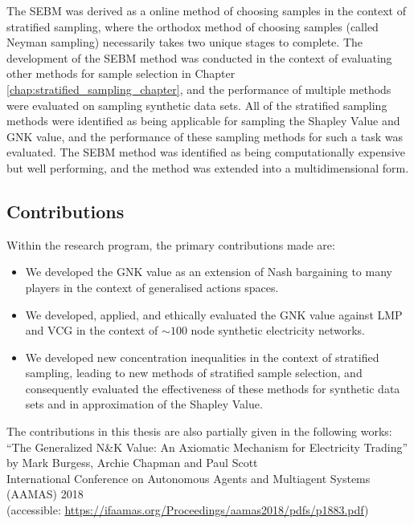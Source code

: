 The SEBM was derived as a online method of choosing samples in the context of stratified sampling, where the orthodox method of choosing samples (called Neyman sampling) necessarily takes two unique stages to complete.
The development of the SEBM method was conducted in the context of evaluating other methods for sample selection in Chapter \ref{chap:stratified_sampling_chapter}, and the performance of multiple methods were evaluated on sampling synthetic data sets.
All of the stratified sampling methods were identified as being applicable for sampling the Shapley Value and GNK value, and the performance of these sampling methods for such a task was evaluated.
The SEBM method was identified as being computationally expensive but well performing, and the method was extended into a multidimensional form.

\subsection{Contributions}

Within the research program, the primary contributions made are:
\begin{itemize}
\item We developed the GNK value as an extension of Nash bargaining to many players in the context of generalised actions spaces.
\item We developed, applied, and ethically evaluated the GNK value against LMP and VCG in the context of $\sim 100$ node synthetic electricity networks.
\item We developed new concentration inequalities in the context of stratified sampling, leading to new methods of stratified sample selection, and consequently evaluated the effectiveness of these methods for synthetic data sets and in approximation of the Shapley Value.
\end{itemize}

\noindent The contributions in this thesis are also partially given in the following works:\\

\noindent``The Generalized N\&K Value: An Axiomatic Mechanism for Electricity Trading'' by Mark Burgess, Archie Chapman and Paul Scott\\ International Conference on Autonomous Agents and Multiagent Systems\\ (AAMAS) 2018\\
(accessible: \href{https://ifaamas.org/Proceedings/aamas2018/pdfs/p1883.pdf}{https://ifaamas.org/Proceedings/aamas2018/pdfs/p1883.pdf})\\


